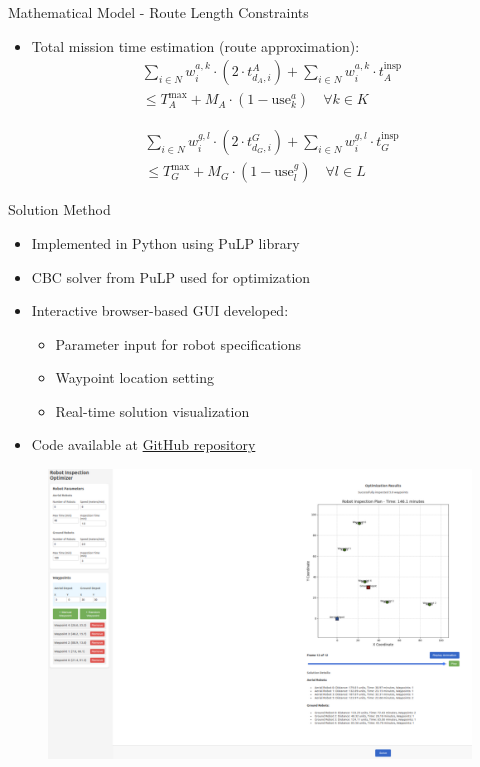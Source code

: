 \documentclass[aspectratio=169,11pt,xcolor={dvipsnames},hyperref={pdftex,pdfpagemode=UseNone,hidelinks,pdfdisplaydoctitle=true},usepdftitle=false]{beamer}
\begin{document}
  \begin{frame}{Mathematical Model - Route Length Constraints}
    \begin{itemize}
      \item Total mission time estimation (route approximation):
      \begin{align}
        \sum_{i \in N} w_i^{a,k} \cdot \left( 2 \cdot t_{d_A,i}^{A}\right) + \sum_{i \in N} w_i^{a,k} \cdot t_A^{\text{insp}} \\ 
        \leq T_A^{\max} + M_A \cdot (1 - \text{use}_k^a) \quad \forall k \in K
      \end{align}
      
      \begin{align}
        \sum_{i \in N} w_i^{g,l} \cdot \left( 2 \cdot t_{d_G,i}^{G}\right) + \sum_{i \in N} w_i^{g,l} \cdot t_G^{\text{insp}} \\
        \leq T_G^{\max} + M_G \cdot (1 - \text{use}_l^g) \quad \forall l \in L
      \end{align}
    \end{itemize}
  \end{frame}

  \begin{frame}{Solution Method}
    \begin{itemize}
      \item Implemented in Python using PuLP library
      \item CBC solver from PuLP used for optimization
      \item Interactive browser-based GUI developed:
        \begin{itemize}
          \item Parameter input for robot specifications
          \item Waypoint location setting
          \item Real-time solution visualization
        \end{itemize}
      \item Code available at \href{https://github.com/jc-cr/multirobot_inspection_optimizer}{GitHub repository}
    \end{itemize}
    
        \begin{figure}
          \centering
          \includegraphics[width=0.48\linewidth]{figures/insp.pdf}
        \end{figure}
      \end{frame}
\end{document}
